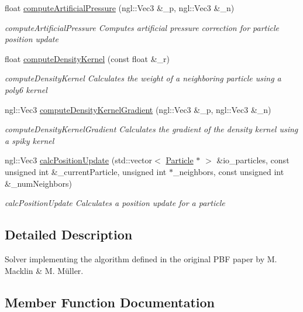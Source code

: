 \begin{DoxyCompactItemize}
float \hyperlink{classFluidSolver_a3fa7473eeaeceaa1431cf3373a529c56}{compute\+Artificial\+Pressure} (ngl\+::\+Vec3 \&\+\_\+p, ngl\+::\+Vec3 \&\+\_\+n)
\begin{DoxyCompactList}\small\item\em compute\+Artificial\+Pressure Computes artificial pressure correction for particle position update \end{DoxyCompactList}\item 
float \hyperlink{classFluidSolver_a28e8d248600643310a501c4394597721}{compute\+Density\+Kernel} (const float \&\+\_\+r)
\begin{DoxyCompactList}\small\item\em compute\+Density\+Kernel Calculates the weight of a neighboring particle using a poly6 kernel \end{DoxyCompactList}\item 
ngl\+::\+Vec3 \hyperlink{classFluidSolver_a18546e3a0f166ad0e58fd2f0175e1d82}{compute\+Density\+Kernel\+Gradient} (ngl\+::\+Vec3 \&\+\_\+p, ngl\+::\+Vec3 \&\+\_\+n)
\begin{DoxyCompactList}\small\item\em compute\+Density\+Kernel\+Gradient Calculates the gradient of the density kernel using a spiky kernel \end{DoxyCompactList}\item 
ngl\+::\+Vec3 \hyperlink{classFluidSolver_ad32394bc1c55ff2bd52df2cc0f003c7a}{calc\+Position\+Update} (std\+::vector$<$ \hyperlink{structParticle}{Particle} $\ast$ $>$ \&io\+\_\+particles, const unsigned int \&\+\_\+current\+Particle, unsigned int $\ast$\+\_\+neighbors, const unsigned int \&\+\_\+num\+Neighbors)
\begin{DoxyCompactList}\small\item\em calc\+Position\+Update Calculates a position update for a particle \end{DoxyCompactList}\end{DoxyCompactItemize}


\subsection{Detailed Description}
Solver implementing the algorithm defined in the original P\+BF paper by M. Macklin \& M. Müller. 

\subsection{Member Function Documentation}
